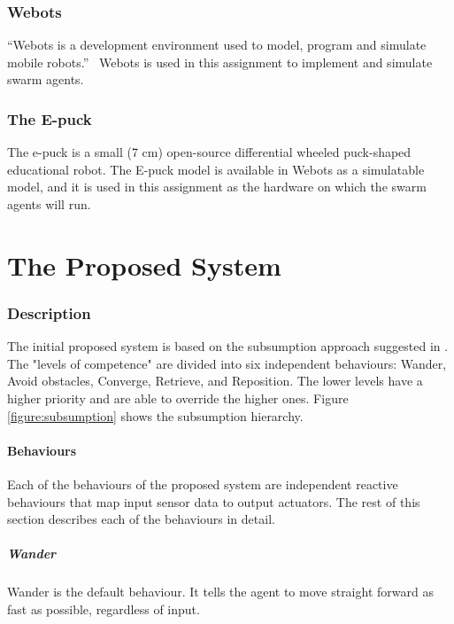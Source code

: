 \documentclass[a4paper]{article}
\begin{document}
\section{Webots}

``Webots is a development environment used to model, program and simulate mobile robots.''~\cite{webots}
Webots is used in this assignment to implement and simulate swarm agents.

\section{The E-puck}

The e-puck is a small (7 cm) open-source differential wheeled puck-shaped educational robot.
The E-puck model is available in Webots as a simulatable model, and it is used in this assignment as the hardware on which the swarm agents will run.

\part{The Proposed System}
\label{part:improved-system}

\section{Description}

The initial proposed system is based on the subsumption approach suggested in \cite{assignment}.
The "levels of competence" are divided into six independent behaviours: Wander, Avoid obstacles, Converge, Retrieve, and Reposition.
The lower levels have a higher priority and are able to override the higher ones.
Figure \vref{figure:subsumption} shows the subsumption hierarchy.



\subsection{Behaviours}
Each of the behaviours of the proposed system are independent reactive behaviours that map input sensor data to output actuators. The rest of this section describes each of the behaviours in detail.

\subsubsection{Wander}
Wander is the default behaviour.
It tells the agent to move straight forward as fast as possible, regardless of input.
\end{document}
